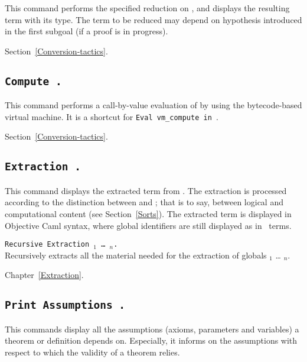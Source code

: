 This command performs the specified reduction on {\term}, and displays
the resulting term with its type. The term to be reduced may depend on
hypothesis introduced in the first subgoal (if a proof is in
progress).

\SeeAlso Section~\ref{Conversion-tactics}.

\subsection[\tt Compute {\term}.]{\tt Compute {\term}.}

This command performs a call-by-value evaluation of {\term} by using
the bytecode-based virtual machine. It is a shortcut for
{\tt Eval vm\_compute in {\term}}.

\SeeAlso Section~\ref{Conversion-tactics}.

\subsection[\tt Extraction \term.]{\tt Extraction \term.\label{ExtractionTerm}
} 
This command displays the extracted term from
{\term}. The extraction is processed according to the distinction
between {\Set} and {\Prop}; that is to say, between logical and
computational content (see Section~\ref{Sorts}). The extracted term is
displayed in Objective Caml syntax, where global identifiers are still
displayed as in \Coq\ terms.

\begin{Variants}
\item \texttt{Recursive Extraction {\qualid$_1$} \ldots{} {\qualid$_n$}.}\\
  Recursively extracts all the material needed for the extraction of 
  globals {\qualid$_1$} \ldots{} {\qualid$_n$}.
\end{Variants}

\SeeAlso Chapter~\ref{Extraction}.

\subsection[\tt Print Assumptions {\qualid}.]{\tt Print Assumptions {\qualid}.}
\label{PrintAssumptions}

This commands display all the assumptions (axioms, parameters and
variables) a theorem or definition depends on.  Especially, it informs
on the assumptions with respect to which the validity of a theorem
relies.

